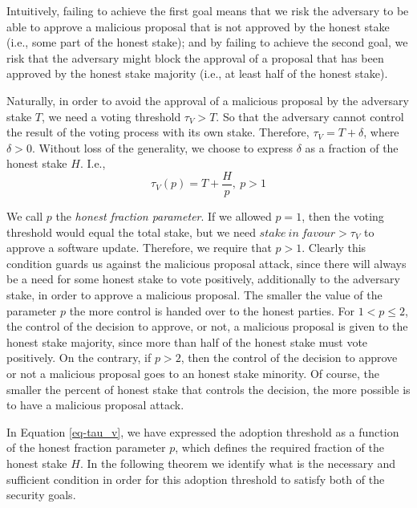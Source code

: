 Intuitively, failing to achieve the first goal means that we risk the adversary to be able to approve a malicious proposal that is not approved by the honest stake (i.e., some part of the honest stake); and by failing to achieve the second goal, we risk that the adversary might block the approval of a proposal that has been approved by the honest stake majority (i.e., at least half of the honest stake). %

Naturally, in order to avoid the approval of a malicious proposal by the adversary stake $T$, we need a voting threshold $\tau_V > T$. So that the adversary cannot control the result of the voting process with its own stake. Therefore, $\tau_V = T + \delta$, where $\delta > 0$. Without loss of the generality, we choose to express $\delta$ as a fraction of the honest stake $H$. I.e.,
\begin{equation} \label{eq-tau_v}
\tau_V(p) = T + \frac{H}{p},\ p > 1
\end{equation}

We call $p$ the \emph{honest fraction parameter}. If we allowed  $p=1$, then the voting threshold would equal the total stake, but we need  $stake\ in\ favour > \tau_V$ to approve a software update. Therefore, we require that $p>1$. Clearly this condition guards us against the malicious proposal attack, since there will always be a need for some honest stake to vote positively, additionally to the adversary stake, in order to approve a malicious proposal. The smaller the value of the parameter $p$ the more control is handed over to the honest parties. For $1 < p \leq 2$, the control of the decision to approve, or not, a malicious proposal is given to the honest stake majority, since more than half of the honest stake must vote positively. On the contrary, if $p > 2$, then the control of the decision to approve or not a malicious proposal goes to an honest stake minority. Of course, the smaller the percent of honest stake that controls the decision, the more possible is to have a malicious proposal attack.

In Equation \ref{eq-tau_v}, we have expressed the adoption threshold as a function of the honest fraction parameter $p$, which defines the required fraction of the honest stake $H$. In the following theorem we identify what is the necessary and sufficient condition in order for this adoption threshold to satisfy both of the security goals.

